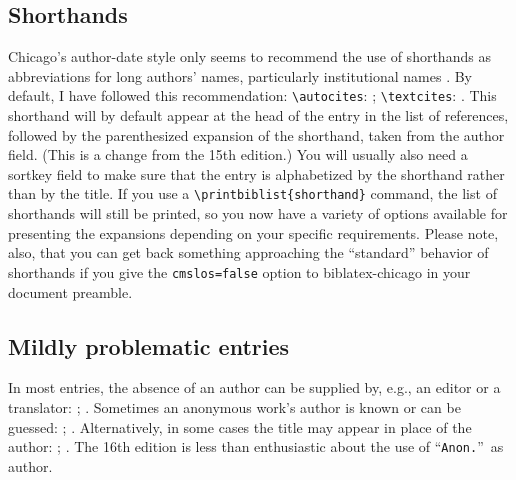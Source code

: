 \documentclass[a4paper,12pt]{report}
\newcommand{\cmd}[1]{\texttt{\textbackslash #1}}
\begin{document}
\subsection*{Shorthands}
\label{sec:shorthands}

Chicago's author-date style only seems to recommend the use of
shorthands as abbreviations for long authors' names, particularly
institutional names \autocite[15.36]{chicago:manual}.  By default, I
have followed this recommendation: \cmd{autocites}:
\autocites{bsi:abbreviation}{iso:electrodoc}; \cmd{textcites}:
\textcites{bsi:abbreviation}{iso:electrodoc}.  This \textsf{shorthand}
will by default appear at the head of the entry in the list of
references, followed by the parenthesized expansion of the shorthand,
taken from the \textsf{author} field.  (This is a change from the 15th
edition.)  You will usually also need a \textsf{sortkey} field to make
sure that the entry is alphabetized by the \textsf{shorthand} rather
than by the \textsf{title}.  If you use a
\cmd{printbiblist\{shorthand\}} command, the list of shorthands will
still be printed, so you now have a variety of options available for
presenting the expansions depending on your specific requirements.
Please note, also, that you can get back something approaching the
\enquote{standard} behavior of shorthands if you give the
\texttt{cmslos=false} option to \textsf{biblatex-chicago} in your
document preamble.

\subsection*{Mildly problematic entries}
\label{sec:problematic}

In most entries, the absence of an author can be supplied by, e.g., an
editor or a translator: \autocite{chaucer:alt};
\autocite{silver:gawain}.  Sometimes an anonymous work's author is
known or can be guessed: \autocite{horsley:prosodies};
\autocite{cook:sotweed}.  Alternatively, in some cases the
\textsf{title} may appear in place of the \textsf{author}:
\autocite{anon:stanze}; \autocite{virginia:plantation}.  The 16th
edition is less than enthusiastic about the use of
\enquote{\texttt{Anon.}}\ as author.
\end{document}
